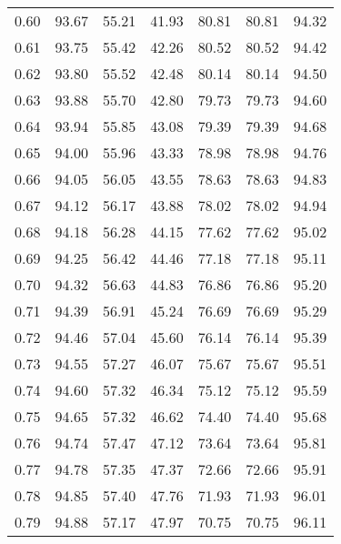 \begin{tabular}{|c|c|c|c|c|c|c|}
      0.60 &     93.67 &     55.21 &      41.93 &   80.81 &      80.81 &         94.32 \\
      0.61 &     93.75 &     55.42 &      42.26 &   80.52 &      80.52 &         94.42 \\
      0.62 &     93.80 &     55.52 &      42.48 &   80.14 &      80.14 &         94.50 \\
      0.63 &     93.88 &     55.70 &      42.80 &   79.73 &      79.73 &         94.60 \\
      0.64 &     93.94 &     55.85 &      43.08 &   79.39 &      79.39 &         94.68 \\
      0.65 &     94.00 &     55.96 &      43.33 &   78.98 &      78.98 &         94.76 \\
      0.66 &     94.05 &     56.05 &      43.55 &   78.63 &      78.63 &         94.83 \\
      0.67 &     94.12 &     56.17 &      43.88 &   78.02 &      78.02 &         94.94 \\
      0.68 &     94.18 &     56.28 &      44.15 &   77.62 &      77.62 &         95.02 \\
      0.69 &     94.25 &     56.42 &      44.46 &   77.18 &      77.18 &         95.11 \\
      0.70 &     94.32 &     56.63 &      44.83 &   76.86 &      76.86 &         95.20 \\
      0.71 &     94.39 &     56.91 &      45.24 &   76.69 &      76.69 &         95.29 \\
      0.72 &     94.46 &     57.04 &      45.60 &   76.14 &      76.14 &         95.39 \\
      0.73 &     94.55 &     57.27 &      46.07 &   75.67 &      75.67 &         95.51 \\
      0.74 &     94.60 &     57.32 &      46.34 &   75.12 &      75.12 &         95.59 \\
      0.75 &     94.65 &     57.32 &      46.62 &   74.40 &      74.40 &         95.68 \\
      0.76 &     94.74 &     57.47 &      47.12 &   73.64 &      73.64 &         95.81 \\
      0.77 &     94.78 &     57.35 &      47.37 &   72.66 &      72.66 &         95.91 \\
      0.78 &     94.85 &     57.40 &      47.76 &   71.93 &      71.93 &         96.01 \\
      0.79 &     94.88 &     57.17 &      47.97 &   70.75 &      70.75 &         96.11 \\

\end{tabular}
